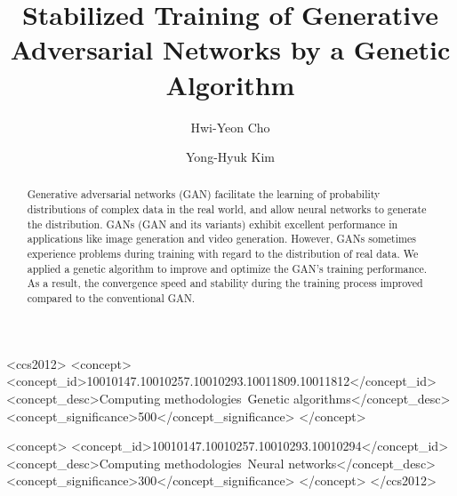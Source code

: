\documentclass[sigconf]{acmart}
\begin{document}
\title{Stabilized Training of Generative Adversarial Networks by a Genetic Algorithm}


\author{Hwi-Yeon Cho}

\author{Yong-Hyuk Kim}

\renewcommand{\shortauthors}{H.-Y. Cho et al.}


\begin{abstract}
Generative adversarial networks (GAN) facilitate the learning of probability distributions of complex data in the real world, and allow neural networks to generate the distribution. GANs (GAN and its variants) exhibit excellent performance in applications like image generation and video generation. However, GANs sometimes experience problems during training with regard to the distribution of real data. We applied a genetic algorithm to improve and optimize the GAN’s training performance. As a result, the convergence speed and stability during the training process improved compared to the conventional GAN.
\end{abstract}


%
%
\begin{CCSXML}
<ccs2012>
  <concept>
    <concept_id>10010147.10010257.10010293.10011809.10011812</concept_id>
    <concept_desc>Computing methodologies~Genetic algorithms</concept_desc>
    <concept_significance>500</concept_significance>
  </concept>

  <concept>
    <concept_id>10010147.10010257.10010293.10010294</concept_id>
    <concept_desc>Computing methodologies~Neural networks</concept_desc>
    <concept_significance>300</concept_significance>
  </concept>
</ccs2012>
\end{CCSXML}





\maketitle







\end{document}
